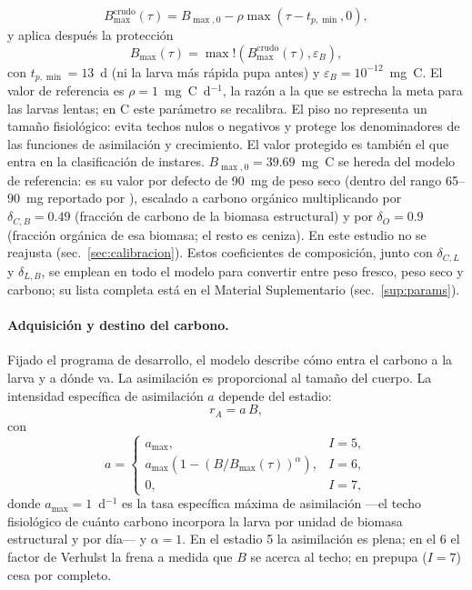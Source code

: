 \begin{equation}
  B_{\max}^{\text{crudo}}(\tau) = B_{\max,0} - \rho \max(\tau - t_{p,\min}, 0),
  \label{eq:techo-crudo}
\end{equation}
y aplica después la protección
\begin{equation}
  B_{\max}(\tau) = \max!\left(B_{\max}^{\text{crudo}}(\tau), \varepsilon_B\right),
  \label{eq:techo}
\end{equation}
con $t_{p,\min} = 13$~d (ni la larva más rápida pupa antes) y $\varepsilon_B = 10^{-12}$~mg~C. El valor de referencia es $\rho = 1$~mg~C~d$^{-1}$, la razón a la que se estrecha la meta para las larvas lentas; en C este parámetro se recalibra. El piso no representa un tamaño fisiológico: evita techos nulos o negativos y protege los denominadores de las funciones de asimilación y crecimiento. El valor protegido es también el que entra en la clasificación de instares. $B_{\max,0} = 39.69$~mg~C se hereda del modelo de referencia: es su valor por defecto de 90~mg de peso seco (dentro del rango 65--90~mg reportado por \citeauthor{eriksenDynamicModellingFeed2022}), escalado a carbono orgánico multiplicando por $\delta_{C,B} = 0.49$ (fracción de carbono de la biomasa estructural) y por $\delta_O = 0.9$ (fracción orgánica de esa biomasa; el resto es ceniza). En este estudio no se reajusta (sec.~\ref{sec:calibracion}). Estos coeficientes de composición, junto con $\delta_{C,L}$ y $\delta_{L,B}$, se emplean en todo el modelo para convertir entre peso fresco, peso seco y carbono; su lista completa está en el Material Suplementario (sec.~\ref{sup:params}).

\paragraph{Adquisición y destino del carbono.}
Fijado el programa de desarrollo, el modelo describe cómo entra el carbono a la larva y a dónde va. La asimilación es proporcional al tamaño del cuerpo. La intensidad específica de asimilación $a$ depende del estadio:
\begin{equation}
  r_A = a\,B,
  \label{eq:asim}
\end{equation}
con
\begin{equation}
  a = \begin{cases}
    a_{\max}, & I = 5, \\[4pt]
    a_{\max}\left(1 - (B/B_{\max}(\tau))^{\alpha}\right), & I = 6, \\[4pt]
    0, & I = 7,
  \end{cases}
  \label{eq:a-estadio}
\end{equation}
donde $a_{\max} = 1$~d$^{-1}$ es la tasa específica máxima de asimilación ---el techo fisiológico de cuánto carbono incorpora la larva por unidad de biomasa estructural y por día--- y $\alpha = 1$. En el estadio 5 la asimilación es plena; en el 6 el factor de Verhulst la frena a medida que $B$ se acerca al techo; en prepupa ($I = 7$) cesa por completo.

